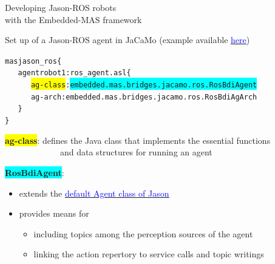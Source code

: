 \documentclass[compress]{beamer}
\newcommand{\link}[2]{\href{#1}{\underline{\textcolor{blue}{#2}}}}
\begin{document}
\begin{frame}[fragile]{Developing Jason-ROS robots\\ {\scriptsize with the Embedded-MAS framework}}
\vspace{1em}
\scriptsize
\begin{block}{Set up of a Jason-ROS agent in JaCaMo {\tiny (example available \link{https://github.com/issia-2026-jason-ros/turtle-example/blob/master/turtle_example.jcm}{here})}}
 \vspace{-1em}
  \begin{alltt}\scriptsize
   mas jason\_ros \{  
   \ \ \ agent robot1: ros\_agent.asl \{
   \ \ \ \ \ \ \colorbox{yellow}{ag-class}: \colorbox{cyan}{embedded.mas.bridges.jacamo.ros.RosBdiAgent}
   \ \ \ \ \ \ ag-arch: embedded.mas.bridges.jacamo.ros.RosBdiAgArch
   \ \ \ \}
  \}
  \end{alltt}    
   \vspace{-1.2em} 
\end{block}

\footnotesize
\colorbox{yellow}{{\bf ag-class}}: defines the Java class that implements the essential functions\\ \ \ \ \ \ \ \ \ \ \ \ \ \ and data structures for running an agent\\

\vspace{.3cm}

\colorbox{cyan}{{\bf RosBdiAgent}}: 
\begin{itemize}
 \item extends the \href{https://github.com/jason-lang/jason/blob/main/jason-interpreter/src/main/java/jason/asSemantics/Agent.java}{\underline{\textcolor{blue}{default Agent class of Jason}}}\\
 \item provides means for 
 \begin{itemize}\scriptsize
   \item including topics among the perception sources of the agent
   \item linking the action repertory to service calls and topic writings
 \end{itemize}
 
\end{itemize}



 
\end{frame}
\end{document}

